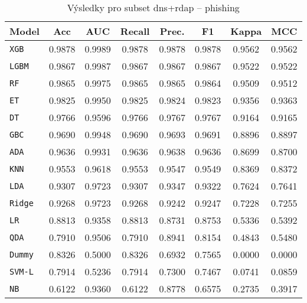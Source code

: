 \begin{table}[H]
  \centering
  \small
  \caption{Výsledky pro subset dns+rdap – phishing}
  \begin{tabular}{|l|c|c|c|c|c|c|c|}
    \hline
    \textbf{Model} & \textbf{Acc} & \textbf{AUC} & \textbf{Recall} & \textbf{Prec.} & \textbf{F1} & \textbf{Kappa} & \textbf{MCC} \\
    \hline
    \texttt{XGB} & 0.9878 & 0.9989 & 0.9878 & 0.9878 & 0.9878 & 0.9562 & 0.9562 \\
    \texttt{LGBM} & 0.9867 & 0.9987 & 0.9867 & 0.9867 & 0.9867 & 0.9522 & 0.9522 \\
    \texttt{RF} & 0.9865 & 0.9975 & 0.9865 & 0.9865 & 0.9864 & 0.9509 & 0.9512 \\
    \texttt{ET} & 0.9825 & 0.9950 & 0.9825 & 0.9824 & 0.9823 & 0.9356 & 0.9363 \\
    \texttt{DT} & 0.9766 & 0.9596 & 0.9766 & 0.9767 & 0.9767 & 0.9164 & 0.9165 \\
    \texttt{GBC} & 0.9690 & 0.9948 & 0.9690 & 0.9693 & 0.9691 & 0.8896 & 0.8897 \\
    \texttt{ADA} & 0.9636 & 0.9931 & 0.9636 & 0.9638 & 0.9636 & 0.8699 & 0.8700 \\
    \texttt{KNN} & 0.9553 & 0.9618 & 0.9553 & 0.9547 & 0.9549 & 0.8369 & 0.8372 \\
    \texttt{LDA} & 0.9307 & 0.9723 & 0.9307 & 0.9347 & 0.9322 & 0.7624 & 0.7641 \\
    \texttt{Ridge} & 0.9268 & 0.9723 & 0.9268 & 0.9242 & 0.9247 & 0.7228 & 0.7255 \\
    \texttt{LR} & 0.8813 & 0.9358 & 0.8813 & 0.8731 & 0.8753 & 0.5336 & 0.5392 \\
    \texttt{QDA} & 0.7910 & 0.9506 & 0.7910 & 0.8941 & 0.8154 & 0.4843 & 0.5480 \\
    \texttt{Dummy} & 0.8326 & 0.5000 & 0.8326 & 0.6932 & 0.7565 & 0.0000 & 0.0000 \\
    \texttt{SVM-L} & 0.7914 & 0.5236 & 0.7914 & 0.7300 & 0.7467 & 0.0741 & 0.0859 \\
    \texttt{NB} & 0.6122 & 0.9360 & 0.6122 & 0.8778 & 0.6575 & 0.2735 & 0.3917 \\
    \hline
  \end{tabular}
\end{table}
\vspace{0.5cm}

